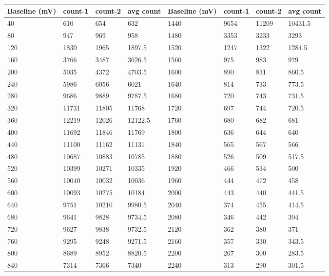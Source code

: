 \begin{table}[!ht]
    \centering
    \begin{tabular}{|l|l|l|l||l|l|l|l|}
    \hline
        Baseline (mV) & count-1 & count-2 & avg count & Baseline (mV) & count-1 & count-2 & avg count \\ \hline
        40 & 610 & 654 & 632 & 1440 & 9654 & 11209 & 10431.5 \\ \hline
        80 & 947 & 969 & 958 & 1480 & 3353 & 3233 & 3293 \\ \hline
        120 & 1830 & 1965 & 1897.5 & 1520 & 1247 & 1322 & 1284.5 \\ \hline
        160 & 3766 & 3487 & 3626.5 & 1560 & 975 & 983 & 979 \\ \hline
        200 & 5035 & 4372 & 4703.5 & 1600 & 890 & 831 & 860.5 \\ \hline
        240 & 5986 & 6056 & 6021 & 1640 & 814 & 733 & 773.5 \\ \hline
        280 & 9686 & 9889 & 9787.5 & 1680 & 720 & 743 & 731.5 \\ \hline
        320 & 11731 & 11805 & 11768 & 1720 & 697 & 744 & 720.5 \\ \hline
        360 & 12219 & 12026 & 12122.5 & 1760 & 680 & 682 & 681 \\ \hline
        400 & 11692 & 11846 & 11769 & 1800 & 636 & 644 & 640 \\ \hline
        440 & 11100 & 11162 & 11131 & 1840 & 565 & 567 & 566 \\ \hline
        480 & 10687 & 10883 & 10785 & 1880 & 526 & 509 & 517.5 \\ \hline
        520 & 10399 & 10271 & 10335 & 1920 & 466 & 534 & 500 \\ \hline
        560 & 10040 & 10032 & 10036 & 1960 & 444 & 472 & 458 \\ \hline
        600 & 10093 & 10275 & 10184 & 2000 & 443 & 440 & 441.5 \\ \hline
        640 & 9751 & 10210 & 9980.5 & 2040 & 374 & 455 & 414.5 \\ \hline
        680 & 9641 & 9828 & 9734.5 & 2080 & 346 & 442 & 394 \\ \hline
        720 & 9627 & 9838 & 9732.5 & 2120 & 362 & 380 & 371 \\ \hline
        760 & 9295 & 9248 & 9271.5 & 2160 & 357 & 330 & 343.5 \\ \hline
        800 & 8689 & 8952 & 8820.5 & 2200 & 267 & 300 & 283.5 \\ \hline
        840 & 7314 & 7366 & 7340 & 2240 & 313 & 290 & 301.5 \\ \hline

\end{tabular}
\end{table}
